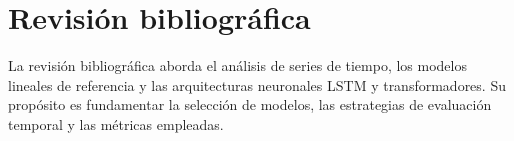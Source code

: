 \section{Revisión bibliográfica}

La revisión bibliográfica aborda el análisis de series de tiempo, los modelos lineales de referencia y las arquitecturas neuronales LSTM y transformadores. Su propósito es fundamentar la selección de modelos, las estrategias de evaluación temporal y las métricas empleadas.

